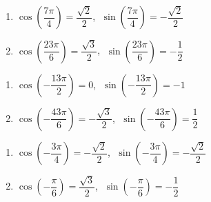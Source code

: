 \begin{multicols}{2}

\begin{enumerate}

\setcounter{enumi}{\value{HW}}

\item $\cos \left(\dfrac{7\pi}{4} \right) = \dfrac{\sqrt{2}}{2}$, $\; \sin \left(\dfrac{7\pi}{4} \right) = -\dfrac{\sqrt{2}}{2}$

\item $\cos\left(\dfrac{23\pi}{6}\right) = \dfrac{\sqrt{3}}{2}$, $\; \sin\left(\dfrac{23\pi}{6}\right) = -\dfrac{1}{2}$

\setcounter{HW}{\value{enumi}}

\end{enumerate}

\end{multicols}

\begin{multicols}{2}

\begin{enumerate}

\setcounter{enumi}{\value{HW}}

\item $\cos \left(-\dfrac{13\pi}{2}\right) = 0$, $\; \sin \left(-\dfrac{13\pi}{2}\right) = -1$ 

\item $\cos\left(-\dfrac{43\pi}{6}\right) = -\dfrac{\sqrt{3}}{2}$, $\; \sin\left(-\dfrac{43\pi}{6}\right) = \dfrac{1}{2}$

\setcounter{HW}{\value{enumi}}

\end{enumerate}

\end{multicols}

\begin{multicols}{2}

\begin{enumerate}

\setcounter{enumi}{\value{HW}}

\item $\cos \left(-\dfrac{3\pi}{4} \right) = -\dfrac{\sqrt{2}}{2}$, $\; \sin \left(-\dfrac{3\pi}{4} \right) = -\dfrac{\sqrt{2}}{2}$

\item $\cos\left(-\dfrac{\pi}{6}\right) = \dfrac{\sqrt{3}}{2}$, $\; \sin\left(-\dfrac{\pi}{6}\right) = -\dfrac{1}{2}$

\setcounter{HW}{\value{enumi}}

\end{enumerate}

\end{multicols}

